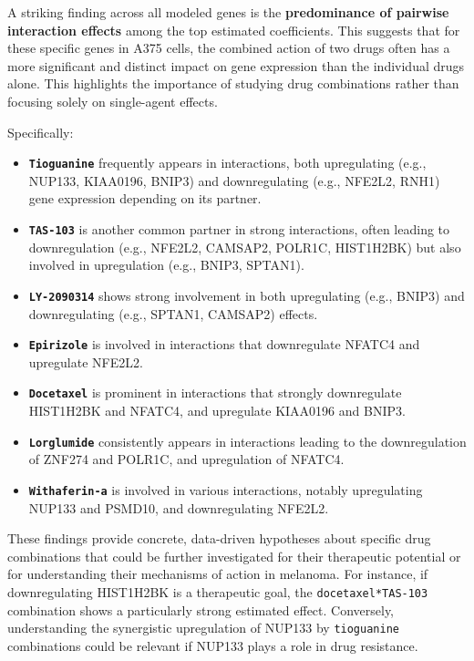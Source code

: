 \documentclass[12pt]{article}
\begin{document}
A striking finding across all modeled genes is the \textbf{predominance of pairwise interaction effects} among the top estimated coefficients. This suggests that for these specific genes in A375 cells, the combined action of two drugs often has a more significant and distinct impact on gene expression than the individual drugs alone. This highlights the importance of studying drug combinations rather than focusing solely on single-agent effects.

Specifically:
\begin{itemize}
    \item \textbf{\texttt{Tioguanine}} frequently appears in interactions, both upregulating (e.g., NUP133, KIAA0196, BNIP3) and downregulating (e.g., NFE2L2, RNH1) gene expression depending on its partner.
    \item \textbf{\texttt{TAS-103}} is another common partner in strong interactions, often leading to downregulation (e.g., NFE2L2, CAMSAP2, POLR1C, HIST1H2BK) but also involved in upregulation (e.g., BNIP3, SPTAN1).
    \item \textbf{\texttt{LY-2090314}} shows strong involvement in both upregulating (e.g., BNIP3) and downregulating (e.g., SPTAN1, CAMSAP2) effects.
    \item \textbf{\texttt{Epirizole}} is involved in interactions that downregulate NFATC4 and upregulate NFE2L2.
    \item \textbf{\texttt{Docetaxel}} is prominent in interactions that strongly downregulate HIST1H2BK and NFATC4, and upregulate KIAA0196 and BNIP3.
    \item \textbf{\texttt{Lorglumide}} consistently appears in interactions leading to the downregulation of ZNF274 and POLR1C, and upregulation of NFATC4.
    \item \textbf{\texttt{Withaferin-a}} is involved in various interactions, notably upregulating NUP133 and PSMD10, and downregulating NFE2L2.
\end{itemize}
These findings provide concrete, data-driven hypotheses about specific drug combinations that could be further investigated for their therapeutic potential or for understanding their mechanisms of action in melanoma. For instance, if downregulating HIST1H2BK is a therapeutic goal, the \texttt{docetaxel*TAS-103} combination shows a particularly strong estimated effect. Conversely, understanding the synergistic upregulation of NUP133 by \texttt{tioguanine} combinations could be relevant if NUP133 plays a role in drug resistance.
\end{document}
